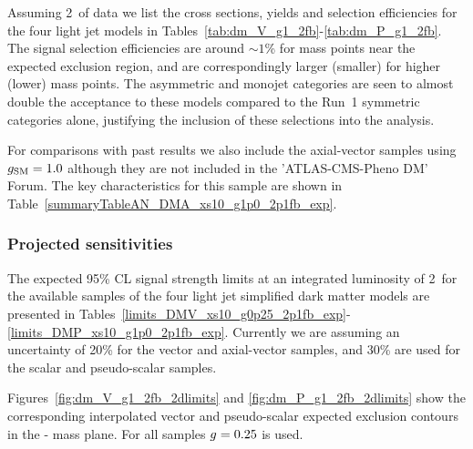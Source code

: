 Assuming 2~\ifb of data we list the cross sections, yields and selection 
efficiencies for the four light jet models in
Tables~\ref{tab:dm_V_g1_2fb}-\ref{tab:dm_P_g1_2fb}. The signal selection
efficiencies are around $\sim 1$\% for mass points near the expected exclusion
region, and are correspondingly larger (smaller) for higher (lower) mass points.
The asymmetric and monojet categories are seen to almost double the acceptance
to these models compared to the Run~1 symmetric categories alone, justifying the
inclusion of these selections into the analysis.




\clearpage 
 \clearpage
 \clearpage
 \clearpage
 \clearpage

\clearpage
For comparisons with past results we also include the axial-vector samples using $g_{\rm SM} = 1.0$ although they are not included in the 
'ATLAS-CMS-Pheno DM' Forum. The key characteristics for this sample are shown in Table~\ref{summaryTableAN_DMA_xs10_g1p0_2p1fb_exp}.

 \clearpage



\subsubsection{Projected sensitivities}

The expected 95\% CL signal strength limits at an integrated luminosity of 2~\ifb for
the available samples of the four light jet simplified dark matter models are
presented in
Tables~\ref{limits_DMV_xs10_g0p25_2p1fb_exp}-\ref{limits_DMP_xs10_g1p0_2p1fb_exp}.
Currently we are assuming an uncertainty of 20\% for the vector and axial-vector samples, and 30\% are used 
for the scalar and pseudo-scalar samples.


Figures~\ref{fig:dm_V_g1_2fb_2dlimits} and \ref{fig:dm_P_g1_2fb_2dlimits} show
the corresponding interpolated vector and pseudo-scalar expected exclusion 
contours in the {\mphi-\mchi} mass plane. For all samples $g_{\rm}=0.25$ is used.



\clearpage
%
% 
%
%

